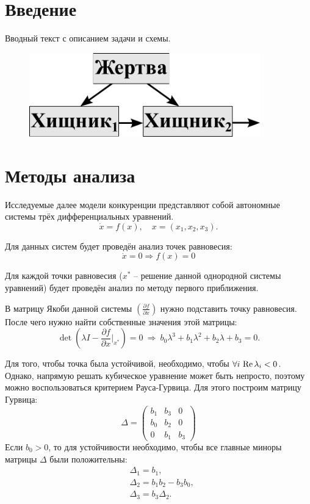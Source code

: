 \section{Введение}
    Вводный текст с описанием задачи и схемы.
    \begin{figure}[H]
        \centering
        \includegraphics[width=10cm]{pictures/scheme.pdf}
    \end{figure}


\pagebreak

\section{Методы анализа}
    Исследуемые далее модели конкуренции представляют собой автономные системы трёх дифференциальных уравнений.
    \[
        \dot{x} = f(x), \quad x = (x_1, x_2, x_3).
    \]

    Для данных систем будет проведён анализ точек равновесия:
    \[
        \dot{x} = 0 \Rightarrow f(x) = 0
    \]

    Для каждой точки равновесия (\( x^* \) -- решение данной однородной системы уравнений) будет проведён анализ по методу первого приближения.

    В матрицу Якоби данной системы \( \left( \frac{\partial f}{\partial x} \right) \) нужно подставить точку равновесия. После чего нужно найти собственные значения этой матрицы:
    \[
        \det \left( \lambda I - \frac{\partial f}{\partial x}\big|_{x^*} \right) = 0 ~ \Rightarrow ~ b_0 \lambda^3 + b_1 \lambda^2 + b_2 \lambda + b_3 = 0.
    \]

    Для того, чтобы точка была устойчивой, необходимо, чтобы \( \forall i \, \operatorname{Re} \lambda_i < 0 \). Однако, напрямую решать кубическое уравнение может быть непросто, поэтому можно воспользоваться критерием Рауса-Гурвица. Для этого построим матрицу Гурвица: 
    \[
        \Delta = \left( \begin{matrix}
            b_1 & b_3 & 0 \\
            b_0 & b_2 & 0 \\
            0   & b_1 & b_3
        \end{matrix} \right)
    \]
    Если \( b_0 > 0\), то для устойчивости необходимо, чтобы все главные миноры матрицы \( \Delta \) были положительны:
    \[
        \begin{split}
            & \Delta_1 = b_1, \\
            & \Delta_2 = b_1 b_2 - b_3 b_0, \\
            & \Delta_3 = b_3 \Delta_2.
        \end{split}
    \]